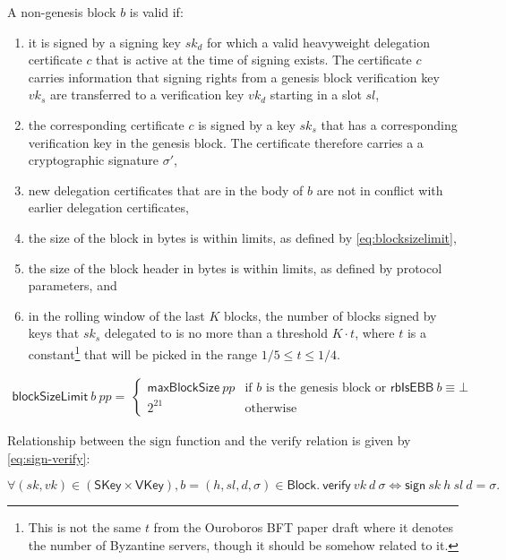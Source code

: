 \documentclass[11pt,a4paper]{article}
\newcommand{\var}[1]{\mathit{#1}}
\newcommand{\fun}[1]{\mathsf{#1}}
\newcommand{\type}[1]{\mathsf{#1}}
\newcommand{\Block}{\type{Block}}
\newcommand{\SKey}{\type{SKey}}
\newcommand{\VKey}{\type{VKey}}
\newcommand{\signname}{sign}
\newcommand{\verifyname}{verify}
\newcommand{\blocksizelimitname}{blockSizeLimit}
\newcommand{\maxblocksizename}{maxBlockSize}
\newcommand{\isebbname}{rbIsEBB}
\newcommand{\sign}[4]{\fun{\signname}\ #1 ~ #2 ~ #3 ~ #4}
\newcommand{\verify}[3]{\fun{\verifyname} ~ #1 ~ #2 ~ #3}
\newcommand{\blocksizelimit}[2]{\fun{\blocksizelimitname} ~ #1 ~ #2}
\newcommand{\maxblocksize}[1]{\fun{\maxblocksizename} ~ #1}
\newcommand{\isebb}[1]{\fun{\isebbname} ~ #1}
\begin{document}
A non-genesis block $\var{b}$ is valid if:
%
\begin{enumerate}
\item it is signed by a signing key $sk_d$ for which a valid heavyweight
  delegation certificate $c$ that is active at the time of signing exists.
  The certificate $c$ carries information that signing rights from a genesis
  block verification key $vk_s$ are transferred to a verification key $vk_d$
  starting in a slot $sl$,
\item the corresponding certificate $c$ is signed by a key $sk_s$ that has a
  corresponding verification key in the genesis block.
  The certificate therefore carries a a cryptographic signature $\sigma'$,
\item new delegation certificates that are in the body of $b$ are not in
  conflict with earlier delegation certificates,
\item the size of the block in bytes is within limits, as defined by
  \eqref{eq:blocksizelimit},
\item the size of the block header in bytes is within limits, as defined by
  protocol parameters, and
\item in the rolling window of the last $K$ blocks, the number of blocks
  signed by keys that $sk_s$ delegated to is no more than a threshold
  $K \cdot t$, where $t$ is a constant\footnote{This is not the same $t$ from
    the Ouroboros BFT paper draft where it denotes the number of Byzantine
    servers, though it should be somehow related to it.}  that will be picked
  in the range $1/5 \leq t \leq 1/4$.
\end{enumerate}

\begin{align}
  \label{eq:blocksizelimit}
  \blocksizelimit{b}{\var{pp}} = \
  \begin{cases}
    \maxblocksize{\var{pp}} & \text{if $b$ is the genesis block or } \isebb{b} \equiv \bot \\
    2^{21} & \text{otherwise}
  \end{cases}
\end{align}


Relationship between the $\text{\signname}$ function and the
$\text{\verifyname}$ relation is given by \eqref{eq:sign-verify}:

\begin{equation}
  \label{eq:sign-verify}
  \forall (sk, vk) \in (\SKey \times \VKey), b = (h, sl, d, \sigma) \in \Block.\
  \verify{vk}{d}{\sigma} \iff \sign{sk}{h}{sl}{d} = \sigma.
\end{equation}
\end{document}
